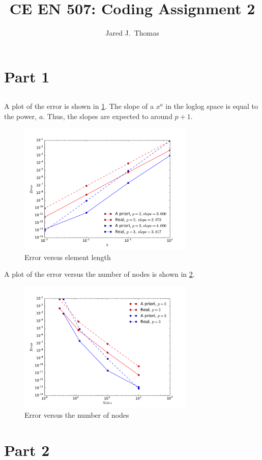 \documentclass{article}
\title{CE EN 507: Coding Assignment 2}
\author{ Jared J.~Thomas}
\begin{document}
\maketitle

\section{Part 1}

\subsection{}
A plot of the error is shown in \cref{fig:11}. The slope of a $x^a$ in the loglog space is equal to the power, $a$. Thus, the slopes are expected to around $p+1$.
\begin{figure}[h!]
	\centering
	\includegraphics[width=0.75\textwidth]{error_he}
	\caption{Error versus element length}
	\label{fig:11}
\end{figure}

A plot of the error versus the number of nodes is shown in \cref{fig:12}.
\begin{figure}[h!]
	\centering
	\includegraphics[width=0.75\textwidth]{error_nodes}
	\caption{Error versus the number of nodes}
	\label{fig:12}
\end{figure}
\subsection{}

\section{Part 2}

\subsection{}

\subsection{}
\end{document}
